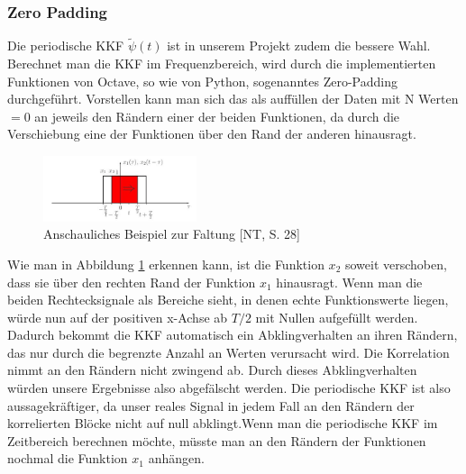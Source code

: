 \subsubsection{Zero Padding}
Die periodische KKF $\tilde{\psi}(t)$ ist in unserem Projekt zudem die bessere Wahl. Berechnet man die KKF im Frequenzbereich, wird durch die implementierten Funktionen von Octave, so wie von Python, sogenanntes Zero-Padding durchgeführt. Vorstellen kann man sich das als auffüllen der Daten mit N Werten $=0$ an jeweils den Rändern einer der beiden Funktionen, da durch die Verschiebung eine der Funktionen über den Rand der anderen hinausragt.
\begin{figure}[ht!] 
  \centering
     \includegraphics[width=0.4\textwidth]{img/Faltung}
  \caption{Anschauliches Beispiel zur Faltung [NT, S. 28]}
  \label{fig:Bild1}
\end{figure}
Wie man in Abbildung \ref{fig:Bild1} erkennen kann, ist die Funktion $x_2$ soweit verschoben, dass sie über den rechten Rand der Funktion $x_1$ hinausragt. Wenn man die beiden Rechtecksignale als Bereiche sieht, in denen echte Funktionswerte liegen, würde nun auf der positiven x-Achse ab $T/2$ mit Nullen aufgefüllt werden. Dadurch bekommt die KKF automatisch ein Abklingverhalten an ihren Rändern, das nur durch die begrenzte Anzahl an Werten verursacht wird. Die Korrelation nimmt an den Rändern nicht zwingend ab. Durch dieses Abklingverhalten würden unsere Ergebnisse also abgefälscht werden. Die periodische KKF ist also aussagekräftiger, da unser reales Signal in jedem Fall an den Rändern der korrelierten Blöcke nicht auf null abklingt.Wenn man die periodische KKF im Zeitbereich berechnen möchte, müsste man an den Rändern der Funktionen nochmal die Funktion $x_1$ anhängen.
